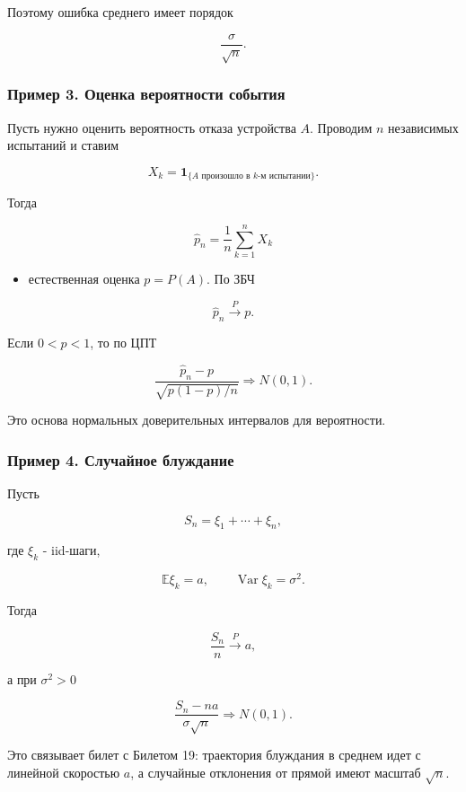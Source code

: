 \documentclass[
  11pt,
  a4paper,
]{article}
\providecommand{\tightlist}{%
  \setlength{\itemsep}{0pt}\setlength{\parskip}{0pt}}
\begin{document}
Поэтому ошибка среднего имеет порядок

\[
\frac{\sigma}{\sqrt n}.
\]

\subsubsection{Пример 3. Оценка вероятности
события}\label{ux43fux440ux438ux43cux435ux440-3.-ux43eux446ux435ux43dux43aux430-ux432ux435ux440ux43eux44fux442ux43dux43eux441ux442ux438-ux441ux43eux431ux44bux442ux438ux44f}

Пусть нужно оценить вероятность отказа устройства \(A\). Проводим \(n\)
независимых испытаний и ставим

\[
X_k=\mathbf 1_{\{A\text{ произошло в }k\text{-м испытании}\}}.
\]

Тогда

\[
\widehat p_n=\frac{1}{n}\sum_{k=1}^nX_k
\]

\begin{itemize}
\tightlist
\item
  естественная оценка \(p=P(A)\). По ЗБЧ
\end{itemize}

\[
\widehat p_n\xrightarrow{P}p.
\]

Если \(0<p<1\), то по ЦПТ

\[
\frac{\widehat p_n-p}{\sqrt{p(1-p)/n}}
\Rightarrow
N(0,1).
\]

Это основа нормальных доверительных интервалов для вероятности.

\subsubsection{Пример 4. Случайное
блуждание}\label{ux43fux440ux438ux43cux435ux440-4.-ux441ux43bux443ux447ux430ux439ux43dux43eux435-ux431ux43bux443ux436ux434ux430ux43dux438ux435}

Пусть

\[
S_n=\xi_1+\cdots+\xi_n,
\]

где \(\xi_k\) - iid-шаги,

\[
\mathbb E\xi_k=a,
\qquad
\operatorname{Var}\xi_k=\sigma^2.
\]

Тогда

\[
\frac{S_n}{n}\xrightarrow{P}a,
\]

а при \(\sigma^2>0\)

\[
\frac{S_n-na}{\sigma\sqrt n}
\Rightarrow
N(0,1).
\]

Это связывает билет с Билетом 19: траектория блуждания в среднем идет с
линейной скоростью \(a\), а случайные отклонения от прямой имеют масштаб
\(\sqrt n\).
\end{document}
